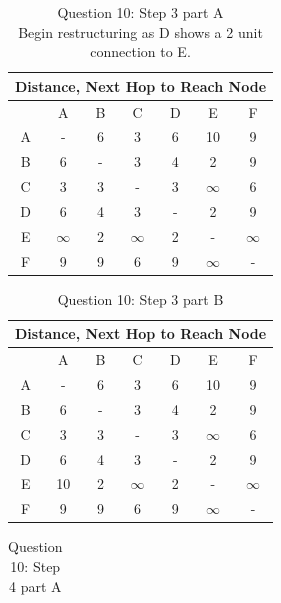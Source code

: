 \documentclass[12pt,addpoints,answers]{exam}
\begin{document}
\begin{questions}
\begin{solution}[5in]
\begin{table}[H]
	\centering
	\caption{Question 10: Step 3  part A \\ Begin restructuring as D shows a 2 unit connection to E.}
	\label{Solution 10}
	\begin{tabular}{|c|c|c|c|c|c|c|}
		\hline
		\multicolumn{7}{|c|}{Distance, Next Hop to Reach Node} \\ \hline
		& A   & B   & C          & D     	& E   & F   				\\ \hline
		A    & -   & 6   & 3          & 6   & 10          & 9   \\
		B    & 6   & -   & 3          & 4   	& 2          & 9   \\
		C    & 3   & 3   & -          & 3   	& $\infty$   & 6   \\
		D    & 6   & 4   & 3          & -   	& 2          & 9   \\
		E    & $\infty$   & 2   & $\infty$   	& 2   & -          & $\infty$   \\
		F    & 9   & 9   & 6          & 9   	& $\infty$          & -  \\ \hline
	\end{tabular}
\end{table}
\begin{table}[H]
	\centering
	\caption{Question 10: Step 3  part B}
	\label{Solution 10}
	\begin{tabular}{|c|c|c|c|c|c|c|}
		\hline
		\multicolumn{7}{|c|}{Distance, Next Hop to Reach Node} \\ \hline
		& A   & B   & C          & D     	& E   & F   				\\ \hline
		A    & -   & 6   & 3          & 6   & 10          & 9   \\
		B    & 6   & -   & 3          & 4   	& 2          & 9   \\
		C    & 3   & 3   & -          & 3   	& $\infty$   & 6   \\
		D    & 6   & 4   & 3          & -   	& 2          & 9   \\
		E    & 10   & 2   & $\infty$   	& 2   & -          & $\infty$   \\
		F    & 9   & 9   & 6          & 9   	& $\infty$          & -  \\ \hline
	\end{tabular}
\end{table}
\begin{table}[H]
	\centering
	\caption{Question 10: Step 4  part A}
	\label{Solution 10}
	\begin{tabular}{|c|c|c|c|c|c|c|}

\end{tabular}
\end{table}
\end{solution}
\end{questions}
\end{document}
